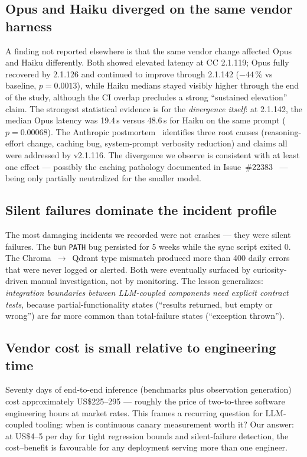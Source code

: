 \documentclass[11pt,a4paper]{article}
\begin{document}
\subsection{Opus and Haiku diverged on the same vendor harness}

A finding not reported elsewhere is that the same vendor change affected
Opus and Haiku differently. Both showed elevated latency at CC 2.1.119; Opus
fully recovered by 2.1.126 and continued to improve through 2.1.142 ($-44\,\%$
vs baseline, $p = 0.0013$), while Haiku medians stayed visibly higher through
the end of the study, although the CI overlap precludes a strong
``sustained elevation'' claim. The strongest statistical evidence is for the
\emph{divergence itself}: at 2.1.142, the median Opus latency was 19.4\,s
versus 48.6\,s for Haiku on the same prompt ($p = 0.00068$). The Anthropic
postmortem~\cite{postmortem} identifies three root causes (reasoning-effort
change, caching bug, system-prompt verbosity reduction) and claims all were
addressed by v2.1.116. The divergence we observe is consistent with at least
one effect --- possibly the caching pathology documented in
Issue~\#22383~\cite{cachingbug} --- being only partially neutralized for the
smaller model.

\subsection{Silent failures dominate the incident profile}

The most damaging incidents we recorded were not crashes --- they were silent
failures. The \texttt{bun} \texttt{PATH} bug persisted for 5 weeks while the
sync script exited 0. The Chroma~$\to$~Qdrant type mismatch produced more
than 400 daily errors that were never logged or alerted. Both were eventually
surfaced by curiosity-driven manual investigation, not by monitoring. The
lesson generalizes: \emph{integration boundaries between LLM-coupled components
need explicit contract tests}, because partial-functionality states
(``results returned, but empty or wrong'') are far more common than total-failure
states (``exception thrown'').

\subsection{Vendor cost is small relative to engineering time}

Seventy days of end-to-end inference (benchmarks plus observation generation)
cost approximately US\$225--295 --- roughly the price of two-to-three software
engineering hours at market rates. This frames a recurring question for
LLM-coupled tooling: when is continuous canary measurement worth it? Our answer:
at US\$4--5 per day for tight regression bounds and silent-failure detection,
the cost--benefit is favourable for any deployment serving more than one
engineer.
\end{document}

